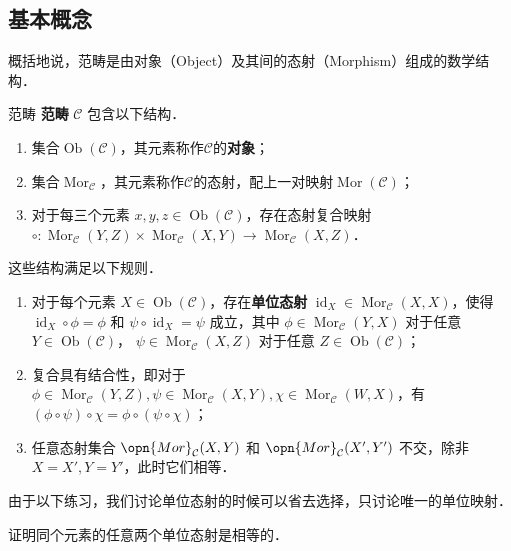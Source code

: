 
\begin{issues}
\issueMissDepend
\issueNeedCite
\issueAbstract
\end{issues}

\subsection{基本概念}
概括地说，范畴是由对象（Object）及其间的态射（Morphism）组成的数学结构．
\begin{definition}{范畴}
\textbf{范畴} $\mathcal{C}$ 包含以下结构．
\begin{enumerate}
    \item 集合$\operatorname{Ob}(\mathcal{C})$，其元素称作$\mathcal{C}$的\textbf{对象}；
    \item 集合$\operatorname{Mor}_{\mathcal{C}}$，其元素称作$\mathcal{C}$的态射，配上一对映射$\operatorname{Mor}(\mathcal{C})$；
    \item 对于每三个元素 $x,y,z\in\operatorname{Ob}(\mathcal{C})$，存在态射复合映射 ${\circ}:\operatorname{Mor}_\mathcal{C}(Y,Z)\times\operatorname{Mor}_{\mathcal{C}}(X,Y)\to\operatorname{Mor}_\mathcal{C}(X,Z)$．
\end{enumerate}
这些结构满足以下规则．
\begin{enumerate}
    \item 对于每个元素 $X\in\operatorname{Ob}(\mathcal{C})$，存在\textbf{单位态射} $\operatorname{id}_X\in\operatorname{Mor}_\mathcal{C}(X,X)$，使得 $\operatorname{id}_X\circ\phi=\phi$ 和 $\psi\circ\operatorname{id}_X=\psi$ 成立，其中 $\phi\in\operatorname{Mor}_\mathcal{C}(Y,X)$ 对于任意 $Y\in\operatorname{Ob}(\mathcal{C})$， $\psi\in\operatorname{Mor}_\mathcal{C}(X,Z)$ 对于任意 $Z\in\operatorname{Ob}(\mathcal{C})$；
    \item 复合具有结合性，即对于 $\phi\in\operatorname{Mor}_\mathcal{C}(Y,Z),\psi\in\operatorname{Mor}_\mathcal{C}(X,Y),\chi\in\operatorname{Mor}_\mathcal{C}(W,X)$，有 $(\phi\circ\psi)\circ\chi=\phi\circ(\psi\circ\chi)$；
    \item 任意态射集合 $\opn{Mor}_\mathcal{C}(X,Y)$ 和 $\opn{Mor}_\mathcal{C}(X',Y')$ 不交，除非 $X=X',Y=Y'$，此时它们相等．
\end{enumerate}
\end{definition}
由于以下练习，我们讨论单位态射的时候可以省去选择，只讨论唯一的单位映射．
\begin{exercise}{}
证明同个元素的任意两个单位态射是相等的．
\end{exercise}
